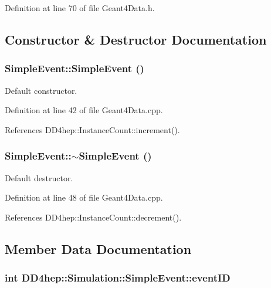 Definition at line 70 of file Geant4Data.h.

\subsection{Constructor \& Destructor Documentation}
\hypertarget{class_d_d4hep_1_1_simulation_1_1_simple_event_a93eec2da5659fe2a6b03bda7362b0940}{
\subsubsection[{SimpleEvent}]{\setlength{\rightskip}{0pt plus 5cm}SimpleEvent::SimpleEvent ()}}
\label{class_d_d4hep_1_1_simulation_1_1_simple_event_a93eec2da5659fe2a6b03bda7362b0940}


Default constructor. 

Definition at line 42 of file Geant4Data.cpp.

References DD4hep::InstanceCount::increment().\hypertarget{class_d_d4hep_1_1_simulation_1_1_simple_event_a77e577dd4deef5466765196cc798c3b9}{
\subsubsection[{$\sim$SimpleEvent}]{\setlength{\rightskip}{0pt plus 5cm}SimpleEvent::$\sim$SimpleEvent ()}}
\label{class_d_d4hep_1_1_simulation_1_1_simple_event_a77e577dd4deef5466765196cc798c3b9}


Default destructor. 

Definition at line 48 of file Geant4Data.cpp.

References DD4hep::InstanceCount::decrement().

\subsection{Member Data Documentation}
\hypertarget{class_d_d4hep_1_1_simulation_1_1_simple_event_a6c196367ec2be5a8cad2afe89d038a6d}{
\subsubsection[{eventID}]{\setlength{\rightskip}{0pt plus 5cm}int {\bf DD4hep::Simulation::SimpleEvent::eventID}}}
\label{class_d_d4hep_1_1_simulation_1_1_simple_event_a6c196367ec2be5a8cad2afe89d038a6d}


